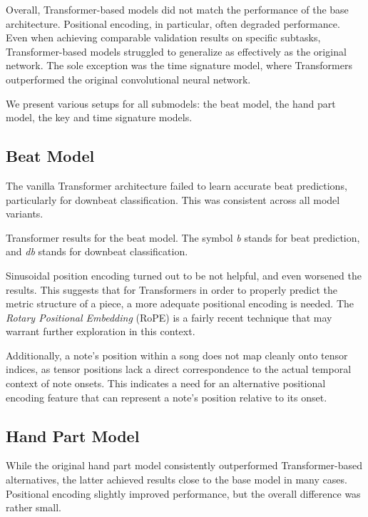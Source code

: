 Overall, Transformer-based models did not match the performance of the base architecture. Positional encoding, in particular, often degraded performance. Even when achieving comparable validation results on specific subtasks, Transformer-based models struggled to generalize as effectively as the original network. The sole exception was the time signature model, where Transformers outperformed the original convolutional neural network.

We present various setups for all submodels: the beat model, the hand part model, the key and time signature models.

\subsection{Beat Model}

The vanilla Transformer architecture failed to learn accurate beat predictions, particularly for downbeat classification. This was consistent across all model variants.

\begin{table}[ht!]
\centering

\caption[Transformer results for the beat model.]{Transformer results for the beat model. The symbol \emph{b} stands for beat prediction, and \emph{db} stands for downbeat classification.}
\label{beat_transformer}
\end{table}

Sinusoidal position encoding turned out to be not helpful, and even worsened the results. This suggests that for Transformers in order to properly predict the metric structure of a piece, a more adequate positional encoding is needed. The \emph{Rotary Positional Embedding} (RoPE) \cite{Su2024} is a fairly recent technique that may warrant further exploration in this context.

Additionally, a note’s position within a song does not map cleanly onto tensor indices, as tensor positions lack a direct correspondence to the actual temporal context of note onsets. This indicates a need for an alternative positional encoding feature that can represent a note’s position relative to its onset.

\subsection{Hand Part Model}

While the original hand part model consistently outperformed Transformer-based alternatives, the latter achieved results close to the base model in many cases. Positional encoding slightly improved performance, but the overall difference was rather small.

